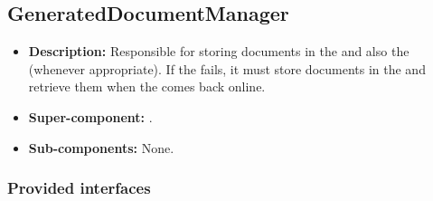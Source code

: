 \subsection{GeneratedDocumentManager}
\begin{itemize}
    \item \textbf{Description:} Responsible for storing documents in the  and also the  (whenever appropriate). If the  fails, it must store documents in the  and retrieve them when the  comes back online.
    \item \textbf{Super-component:} .
    \item \textbf{Sub-components:} None.
\end{itemize}

\subsubsection*{Provided interfaces}
